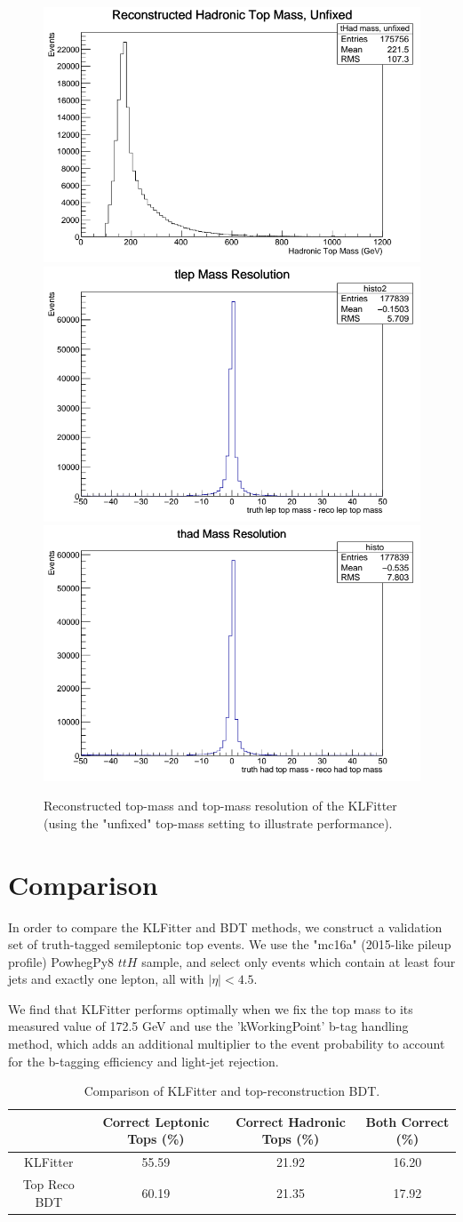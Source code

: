 \begin{figure}
	\centering
	\includegraphics[width=0.31\linewidth]{figures/KLFitter/KLFittertopmass.png}
	\includegraphics[width=0.31\linewidth]{figures/KLFitter/KLfitter1.png}
	\includegraphics[width=0.31\linewidth]{figures/KLFitter/KLfitter2.png}
	\caption{Reconstructed top-mass and top-mass resolution of the KLFitter (using the "unfixed" top-mass setting to illustrate performance).}
	\label{fig:sel_topReco_retrain}
\end{figure}

\section{Comparison} \label{sec:comparison} 

In order to compare the KLFitter and BDT methods, we construct a validation set of truth-tagged semileptonic top events. We use the "mc16a" (2015-like pileup profile) PowhegPy8 $ttH$ sample, and select only events which contain at least four jets and exactly one lepton, all with $|\eta|< 4.5$.

We find that KLFitter performs optimally when we fix the top mass to its measured value of 172.5 GeV \cite{PDG} and use the 'kWorkingPoint' b-tag handling method, which adds an additional multiplier to the event probability to account for the b-tagging efficiency and light-jet rejection. 

\begin{table}[h]
    \centering
    \begin{tabular}{|c|c|c|c|}
    \hline
    & Correct Leptonic Tops (\%) & Correct Hadronic Tops (\%) & Both Correct (\%) \\ \hline
    KLFitter & 55.59 & 21.92 & 16.20 \\ \hline
    Top Reco BDT & 60.19 & 21.35 & 17.92 \\ \hline   	
    \end{tabular}
    \caption{Comparison of KLFitter and top-reconstruction BDT.}
    \label{KLFitterTable}
\end{table}
